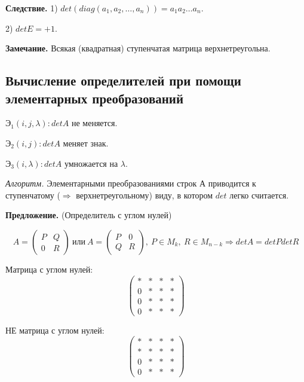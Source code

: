 \bigskip
\textbf{Следствие.} 1) $det(diag(a_1, a_2, \dots, a_n)) = a_1 a_2 \dots a_n$.

2) $detE = +1$.

\bigskip
\textbf{Замечание.} Всякая (квадратная) ступенчатая матрица верхнетреугольна.

\bigskip
\subsection{Вычисление определителей при помощи элементарных преобразований}

\bigskip
$Э_1 (i, j, \lambda): detA$ не меняется.

$Э_2 (i, j): detA$ меняет знак.

$Э_3 (i, \lambda): detA$ умножается на $\lambda$.

\bigskip
\textit{Алгоритм.} Элементарными преобразованиями строк А приводится к ступенчатому  ($\Rightarrow$ верхнетреугольному) виду, в котором $det$ легко считается.

\bigskip
\textbf{Предложение.} (Определитель с углом нулей) 

\begin{equation*} A = 
\left(
\begin{array}{c|c}
  P & Q \\
  \hline
  0 & R
\end{array}
\right) \ или \ A = 
\left(
\begin{array}{c|c}
  P & 0 \\
  \hline
  Q & R
\end{array}
\right),\ P \in M_k, \ R \in M_{n-k} \Rightarrow detA = detP detR
\end{equation*}

Матрица с углом нулей:
\begin{equation*} 
\left(
\begin{array}{c|ccc}
  * & * & * & * \\
  \hline
  0 & * & * & * \\
  0 & * & * & * \\
  0 & * & * & *
\end{array}
\right)
\end{equation*}

НЕ матрица с углом нулей:
\begin{equation*} 
\left(
\begin{array}{c|ccc}
  * & * & * & * \\
  * & * & * & * \\
  \hline
  0 & * & * & * \\
  0 & * & * & *
\end{array}
\right)
\end{equation*}

